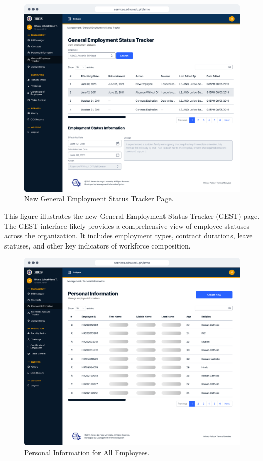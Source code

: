     \begin{figure}[H]
        \centering
        \includegraphics[width=1\linewidth]{figures/app/gest.png}
        \caption{New General Employment Status Tracker Page.}
        \label{fig:app-gest}
    \end{figure}

    This figure illustrates the new General Employment Status Tracker (GEST) page. The GEST interface likely provides a comprehensive view of employee statuses across the organization. It includes employment types, contract durations, leave statuses, and other key indicators of workforce composition. 

    \begin{figure}[H]
        \centering
        \includegraphics[width=1\linewidth]{figures/app/pi.png}
        \caption{Personal Information for All Employees.}
        \label{fig:app-pi}
    \end{figure}

